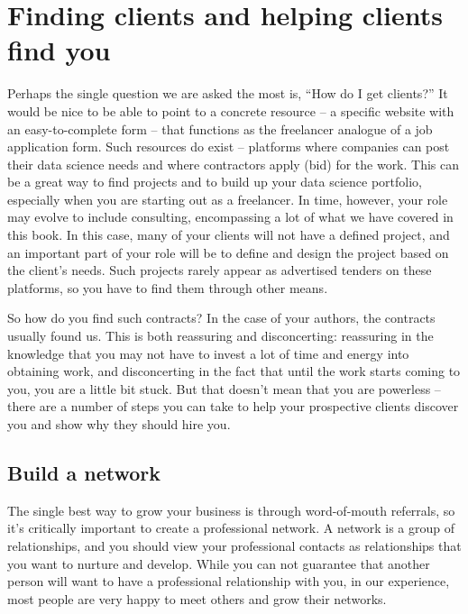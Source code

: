 \documentclass[]{book}
\begin{document}
\hypertarget{finding-clients-and-helping-clients-find-you}{%
\section{Finding clients and helping clients find
you}\label{finding-clients-and-helping-clients-find-you}}

Perhaps the single question we are asked the most is, ``How do I get
clients?'' It would be nice to be able to point to a concrete resource
-- a specific website with an easy-to-complete form -- that functions as
the freelancer analogue of a job application form. Such resources do
exist -- platforms where companies can post their data science needs and
where contractors apply (bid) for the work. This can be a great way to
find projects and to build up your data science portfolio, especially
when you are starting out as a freelancer. In time, however, your role
may evolve to include consulting, encompassing a lot of what we have
covered in this book. In this case, many of your clients will not have a
defined project, and an important part of your role will be to define
and design the project based on the client's needs. Such projects rarely
appear as advertised tenders on these platforms, so you have to find
them through other means.

So how do you find such contracts? In the case of your authors, the
contracts usually found us. This is both reassuring and disconcerting:
reassuring in the knowledge that you may not have to invest a lot of
time and energy into obtaining work, and disconcerting in the fact that
until the work starts coming to you, you are a little bit stuck. But
that doesn't mean that you are powerless -- there are a number of steps
you can take to help your prospective clients discover you and show why
they should hire you.

\hypertarget{build-a-network}{%
\subsection{Build a network}\label{build-a-network}}

The single best way to grow your business is through word-of-mouth
referrals, so it's critically important to create a professional
network. A network is a group of relationships, and you should view your
professional contacts as relationships that you want to nurture and
develop. While you can not guarantee that another person will want to
have a professional relationship with you, in our experience, most
people are very happy to meet others and grow their networks.
\end{document}
